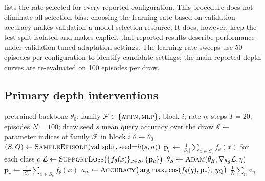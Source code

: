 \documentclass[11pt]{article}
\begin{document}
 lists the rate selected for every reported configuration. This procedure does not eliminate all selection bias: choosing the learning rate based on validation accuracy makes validation a model-selection resource. It does, however, keep the test split isolated and makes explicit that reported results describe performance under validation-tuned adaptation settings. The learning-rate sweeps use 50 episodes per configuration to identify candidate settings; the main reported depth curves are re-evaluated on 100 episodes per draw.

\subsection{Primary depth interventions}

\begin{algorithm}[t]
\caption{Episodic depth intervention. One evaluated configuration is the triple
(parameter family $\mathcal{F}$, block index $i$, learning rate $\eta$). The
backbone is restored from the pretrained snapshot before every episode, so no
information crosses episode boundaries.}
\label{alg:depth}
\begin{algorithmic}[1]
\Require pretrained backbone $\theta_0$; family $\mathcal{F}\in\{\textsc{attn},\textsc{mlp}\}$;
block $i$; rate $\eta$; steps $T{=}20$; episodes $N{=}100$; draw seed $s$
\Ensure mean query accuracy over the draw
\State $\mathcal{S}\gets$ parameter indices of family $\mathcal{F}$ in block $i$
  \State $\theta \gets \theta_0$ 
  \State $(S, Q) \gets \textsc{SampleEpisode}(\text{val split}, \text{seed}{=}h(s,n))$
    \State $\mathbf{p}_c \gets \frac{1}{|S_c|}\sum_{x\in S_c} f_\theta(x)$ for each class $c$
    \State $\mathcal{L} \gets \textsc{SupportLoss}\big(\{f_\theta(x)\}_{x\in S}, \{\mathbf{p}_c\}\big)$
    \State $\theta_{\mathcal{S}} \gets \textsc{Adam}(\theta_{\mathcal{S}}, \nabla_{\theta_{\mathcal{S}}}\mathcal{L}, \eta)$
  \EndFor
  \State $\mathbf{p}_c \gets \frac{1}{|S_c|}\sum_{x\in S_c} f_\theta(x)$
  \State $a_n \gets \textsc{Accuracy}\big(\arg\max_c \cos(f_\theta(q), \mathbf{p}_c),\; y_Q\big)$
\EndFor
\State \Return $\frac{1}{N}\sum_n a_n$
\end{algorithmic}
\end{algorithm}
\end{document}
